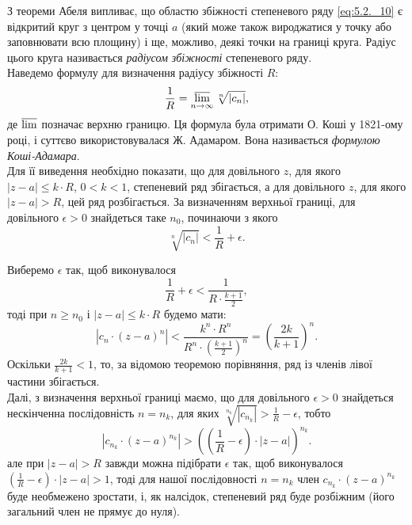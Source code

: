 З теореми Абеля випливає, що областю збіжності степеневого ряду \eqref{eq:5.2._10} є відкритий круг з центром у точці $a$ (який може також вироджатися у точку або заповнювати всю площину) і ще, можливо, деякі точки на границі круга. Радіус цього круга називається \textit{радіусом збіжності} степеневого ряду. \\

Наведемо формулу для визначення радіусу збіжності $R$:
\begin{equation}
	\label{eq:5.2.4}
	\frac 1 R = \varlimsup\limits_{n \to \infty} \sqrt[n]{|c_n|},
\end{equation}
де $\varlimsup$ позначає верхню границю. Ця формула була отримати О. Коші у 1821-ому році, і суттєво використовувалася Ж. Адамаром. Вона називається \textit{формулою Коші-Адамара}. \\

Для її виведення необхідно показати, що для довільного $z$, для якого $|z - a| \le k \cdot R$, $0 < k < 1$, степеневий ряд збігається, а для довільного $z$, для якого $|z - a| > R$, цей ряд розбігається. За визначенням верхньої границі, для довільного $\epsilon > 0$ знайдеться таке $n_0$, починаючи з якого 
\begin{equation*}
	\sqrt[n]{|c_n|} < \frac1R + \epsilon.
\end{equation*}

Виберемо $\epsilon$ так, щоб виконувалося
\begin{equation*}
	\frac1R + \epsilon < \frac{1}{R \cdot \frac{k + 1}{2}},
\end{equation*}
тоді при $n \ge n_0$ і $|z - a| \le k \cdot R$ будемо мати:
\begin{equation*}
	|c_n \cdot (z - a)^n | < \frac{k^n \cdot R^n}{R^n \cdot \left(\frac{k + 1}{2}\right)^n} = \left( \frac{2 k}{k + 1} \right)^n.
\end{equation*}
Оскільки $\frac{2 k}{k + 1} < 1$, то, за відомою теоремою порівняння, ряд із членів лівої частини збігається. \\

Далі, з визначення верхньої границі маємо, що для довільного $\epsilon > 0$ знайдеться нескінченна послідовність $n = n_k$, для яких $\sqrt[n_k]{|c_{n_k}|} > \frac1R - \epsilon$, тобто
\begin{equation*}
	\left| c_{n_k} \cdot (z - a)^{n_k} \right| > \left( \left(\frac1R - \epsilon\right) \cdot|z-a| \right)^{n_k}.
\end{equation*}
але при $|z - a| > R$ завжди можна підібрати $\epsilon$ так, щоб виконувалося $\left(\frac1R - \epsilon\right) \cdot|z-a| > 1$, тоді для нашої послідовності $n = n_k$ член $c_{n_k} \cdot (z-a)^{n_k}$ буде необмежено зростати, і, як налсідок, степеневий ряд буде розбіжним (його загальний член не прямує до нуля). \\


